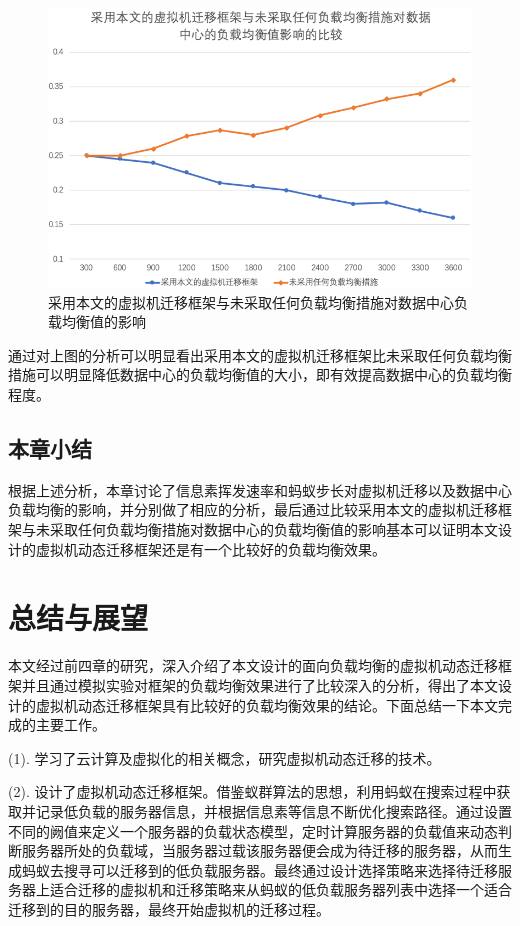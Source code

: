 \begin{figure}[htb]
  \centering
  \includegraphics{./Figure/IMG_Chap4_8.png}
  \caption{采用本文的虚拟机迁移框架与未采取任何负载均衡措施对数据中心负载均衡值的影响}\label{Fig:chap4_5}
\end{figure}

通过对上图的分析可以明显看出采用本文的虚拟机迁移框架比未采取任何负载均衡措施可以明显降低数据中心的负载均衡值的大小，即有效提高数据中心的负载均衡程度。

 \section{本章小结}
根据上述分析，本章讨论了信息素挥发速率和蚂蚁步长对虚拟机迁移以及数据中心负载均衡的影响，并分别做了相应的分析，最后通过比较采用本文的虚拟机迁移框架与未采取任何负载均衡措施对数据中心的负载均衡值的影响基本可以证明本文设计的虚拟机动态迁移框架还是有一个比较好的负载均衡效果。

\chapter{总结与展望}
本文经过前四章的研究，深入介绍了本文设计的面向负载均衡的虚拟机动态迁移框架并且通过模拟实验对框架的负载均衡效果进行了比较深入的分析，得出了本文设计的虚拟机动态迁移框架具有比较好的负载均衡效果的结论。下面总结一下本文完成的主要工作。

    (1). 学习了云计算及虚拟化的相关概念，研究虚拟机动态迁移的技术。
    
    (2). 设计了虚拟机动态迁移框架。借鉴蚁群算法的思想，利用蚂蚁在搜索过程中获取并记录低负载的服务器信息，并根据信息素等信息不断优化搜索路径。通过设置不同的阙值来定义一个服务器的负载状态模型，定时计算服务器的负载值来动态判断服务器所处的负载域，当服务器过载该服务器便会成为待迁移的服务器，从而生成蚂蚁去搜寻可以迁移到的低负载服务器。最终通过设计选择策略来选择待迁移服务器上适合迁移的虚拟机和迁移策略来从蚂蚁的低负载服务器列表中选择一个适合迁移到的目的服务器，最终开始虚拟机的迁移过程。

